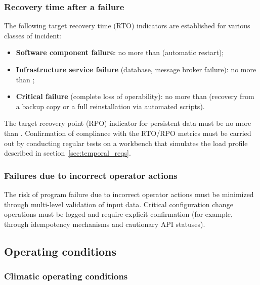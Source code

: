 \documentclass[12pt,a4paper]{extarticle}
\begin{document}
\subsubsection{Recovery time after a failure}

\begin{hseExample}
The following target recovery time (RTO) indicators are established for various classes of incident:
\begin{itemize}[nosep, leftmargin=1.25cm]
    \item \textbf{Software component failure}: no more than  (automatic restart);
    \item \textbf{Infrastructure service failure} (database, message broker failure): no more than ;
    \item \textbf{Critical failure} (complete loss of operability): no more than  (recovery from a backup copy or a full reinstallation via automated scripts).
\end{itemize}

The target recovery point (RPO) indicator for persistent data must be no more than . Confirmation of compliance with the RTO/RPO metrics must be carried out by conducting regular tests on a workbench that simulates the load profile described in section~\ref{sec:temporal_reqs}.
\end{hseExample}

\subsubsection{Failures due to incorrect operator actions}

\begin{hseExample}
The risk of program failure due to incorrect operator actions must be minimized through multi-level validation of input data. Critical configuration change operations must be logged and require explicit confirmation (for example, through idempotency mechanisms and cautionary API statuses).
\end{hseExample}

\clearpage

\subsection{Operating conditions}

\subsubsection{Climatic operating conditions}
\end{document}
